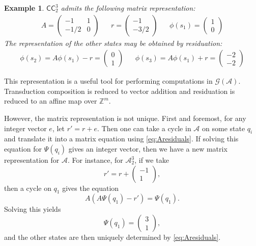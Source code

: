 \documentclass[12pt, letterpaper]{article}
\newcommand{\Z}{\mathbb Z}
\newcommand{\A}{\mathcal A}
\newcommand{\CC}{\mathsf{CC}}
\newcommand{\gp}{\mathcal G}
\newtheorem{example}[thm]{Example}
\begin{document}
\begin{example}
    $\CC^3_2$ admits the following matrix representation:
    \begin{align*}
        A = \begin{pmatrix}
            -1 & 1\\
            -1/2 & 0
        \end{pmatrix}
        &&
        r = \begin{pmatrix}-1\\-3/2\end{pmatrix}
        &&
        \phi(s_1) = \begin{pmatrix} 1\\0 \end{pmatrix}
    \end{align*}
    The representation of the other states may be obtained by residuation:
    \begin{align*}
        \phi(s_2) = A \phi(s_1) - r = \begin{pmatrix}
            0\\
            1
        \end{pmatrix}
        &&
        \phi(s_3) = A \phi(s_1) + r = \begin{pmatrix}
            -2\\
            -2
        \end{pmatrix}
    \end{align*}
\end{example}

This representation is a useful tool for performing computations in
$\gp(\A)$. Transduction composition is reduced to vector addition and
residuation is reduced to an affine map over $\Z^m$.

However, the matrix representation is not unique. First and foremost, for any
integer vector $e$, let $r' = r + e$. Then one can take a cycle in $\A$ on
some state $q_i$ and translate it into a matrix equation using
\cref{eq:Aresiduals}. If solving this equation for $\Psi(q_i)$ gives an
integer vector, then we have a new matrix representation for $\A$. For
instance, for $\A^3_2$, if we take
\[
    r' = r + \begin{pmatrix}
        -1\\
        1
    \end{pmatrix},
\]
then a cycle on $q_1$ gives the equation
\[
    A (A\Psi(q_1) - r') = \Psi(q_1).
\]
Solving this yields
\[
    \Psi(q_1) = \begin{pmatrix}
        3\\
        1
    \end{pmatrix},
\]
and the other states are then uniquely determined by \cref{eq:Aresiduals}.
\end{document}
